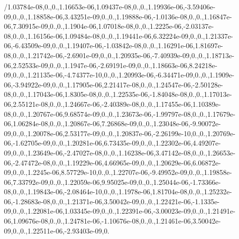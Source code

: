{/1.\-03784e-\/08,0.,0.,1.\-16653e-\/06,1.\-09437e-\/08,0.,0.,1.\-19936e-\/06,-\/3.\-59406e-\/09,0.,0.,1.\-18858e-\/06,3.\-43251e-\/09,0.,0.,1.\-19888e-\/06,-\/1.\-0136e-\/08,0.,0.,1.\-16847e-\/06,7.\-30915e-\/09,0.,0.,1.\-1904e-\/06,1.\-07018e-\/08,0.,0.,1.\-2225e-\/06,-\/2.\-03137e-\/08,0.,0.,1.\-16156e-\/06,1.\-09484e-\/08,0.,0.,1.\-19441e-\/06,6.\-32224e-\/09,0.,0.,1.\-21337e-\/06,-\/6.\-43509e-\/09,0.,0.,1.\-19407e-\/06,-\/1.\-03842e-\/08,0.,0.,1.\-16291e-\/06,1.\-81697e-\/08,0.,0.,1.\-21742e-\/06,-\/2.\-6901e-\/09,0.,0.,1.\-20935e-\/06,-\/7.\-40939e-\/09,0.,0.,1.\-18713e-\/06,2.\-52533e-\/09,0.,0.,1.\-1947e-\/06,-\/2.\-69191e-\/09,0.,0.,1.\-18663e-\/06,8.\-24218e-\/09,0.,0.,1.\-21135e-\/06,-\/4.\-74377e-\/10,0.,0.,1.\-20993e-\/06,-\/6.\-34471e-\/09,0.,0.,1.\-1909e-\/06,-\/3.\-94922e-\/09,0.,0.,1.\-17905e-\/06,2.\-21417e-\/08,0.,0.,1.\-24547e-\/06,-\/2.\-50128e-\/08,0.,0.,1.\-17043e-\/06,1.\-8305e-\/08,0.,0.,1.\-22535e-\/06,-\/1.\-84048e-\/08,0.,0.,1.\-17013e-\/06,2.\-55121e-\/08,0.,0.,1.\-24667e-\/06,-\/2.\-40389e-\/08,0.,0.,1.\-17455e-\/06,1.\-10389e-\/08,0.,0.,1.\-20767e-\/06,9.\-68574e-\/09,0.,0.,1.\-23673e-\/06,-\/1.\-99797e-\/08,0.,0.,1.\-17679e-\/06,1.\-06284e-\/08,0.,0.,1.\-20867e-\/06,7.\-26868e-\/09,0.,0.,1.\-23048e-\/06,-\/9.\-90072e-\/09,0.,0.,1.\-20078e-\/06,2.\-53177e-\/09,0.,0.,1.\-20837e-\/06,-\/2.\-26199e-\/10,0.,0.,1.\-20769e-\/06,-\/1.\-62705e-\/09,0.,0.,1.\-20281e-\/06,6.\-73435e-\/09,0.,0.,1.\-22302e-\/06,4.\-49207e-\/09,0.,0.,1.\-23649e-\/06,-\/2.\-47027e-\/08,0.,0.,1.\-16238e-\/06,3.\-47142e-\/08,0.,0.,1.\-26653e-\/06,-\/2.\-47472e-\/08,0.,0.,1.\-19229e-\/06,4.\-66965e-\/09,0.,0.,1.\-20629e-\/06,6.\-06872e-\/09,0.,0.,1.\-2245e-\/06,8.\-57729e-\/10,0.,0.,1.\-22707e-\/06,-\/9.\-49952e-\/09,0.,0.,1.\-19858e-\/06,7.\-33792e-\/09,0.,0.,1.\-22059e-\/06,9.\-95025e-\/09,0.,0.,1.\-25044e-\/06,-\/1.\-73366e-\/08,0.,0.,1.\-19843e-\/06,-\/2.\-08464e-\/10,0.,0.,1.\-1978e-\/06,1.\-81704e-\/08,0.,0.,1.\-25232e-\/06,-\/1.\-28683e-\/08,0.,0.,1.\-21371e-\/06,3.\-50042e-\/09,0.,0.,1.\-22421e-\/06,-\/1.\-1335e-\/09,0.,0.,1.\-22081e-\/06,1.\-03345e-\/09,0.,0.,1.\-22391e-\/06,-\/3.\-00023e-\/09,0.,0.,1.\-21491e-\/06,1.\-09676e-\/08,0.,0.,1.\-24781e-\/06,-\/1.\-10676e-\/08,0.,0.,1.\-21461e-\/06,3.\-50042e-\/09,0.,0.,1.\-22511e-\/06,-\/2.\-93403e-\/09,0.}
